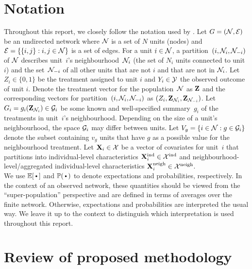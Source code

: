 \documentclass[10pt]{article}
\begin{document}
\section{Notation} \label{sec:notation}

Throughout this report, we closely follow the notation used by \textcite{Forastiere:2021}. Let $G=(\mathcal{N},\mathcal{E})$ be an undirected network where $\mathcal{N}$ is a set of $N$ units (nodes) and $\mathcal{E}=\{\{i,j\}: i,j\in\mathcal{N}\}$ is a set of edges. For a unit $i\in\mathcal{N}$, a partition~$(i,\mathcal{N}_i,\mathcal{N}_{-i})$ of $\mathcal{N}$ describes unit~$i$'s neighbourhood~$\mathcal{N}_i$ (the set of $N_i$ units connected to unit $i$) and the set~$\mathcal{N}_{-i}$ of all other units that are not $i$ and that are not in $\mathcal{N}_i$. Let $Z_i\in\{0,1\}$ be the treatment assigned to unit $i$ and $Y_i\in\mathcal{Y}$ the observed outcome of unit $i$.
Denote the treatment vector for the population~$\mathcal{N}$ as $\mathbf{Z}$ and the corresponding vectors for partition~$(i,\mathcal{N}_i,\mathcal{N}_{-i})$ as $(Z_i,\mathbf{Z}_{\mathcal{N}_i},\mathbf{Z}_{\mathcal{N}_{-i}})$.
Let $G_i=g_i(\mathbf{Z}_{\mathcal{N}_i})\in\mathcal{G}_i$ be some known and well-specified summary~$g_i$ of the treatments in unit~$i$'s neighbourhood.
Depending on the size of a unit's neighbourhood, the space $\mathcal{G}_i$ may differ between units. Let $V_g=\{i\in\mathcal{N}:g\in\mathcal{G}_i\}$ denote the subset containing $v_g$ units that have $g$ as a possible value for the neighbourhood treatment. Let $\mathbf{X}_i\in\mathcal{X}$ be a vector of covariates for unit~$i$ that partitions into individual-level characteristics $\mathbf{X}^{\text{ind}}_i\in\mathcal{X}^\text{ind}$ and neighbourhood-level/aggregated individual-level characteristics $\mathbf{X}^{\text{neigh}}_i\in\mathcal{X}^\text{neigh}$.
\\

We use $\E[\argdot]$ and $\P(\argdot)$ to denote expectations and probabilities, respectively. In the context of an observed network, these quantities should be viewed from the ``super-population'' perspective \parencite{Imbens:2015} and are defined in terms of averages over the finite network. Otherwise, expectations and probabilities are interpreted the usual way. We leave it up to the context to distinguish which interpretation is used throughout this report.


\section{Review of proposed methodology} \label{sec:summary}
\end{document}
